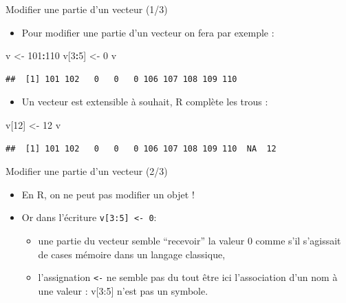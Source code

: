 \documentclass[
  ignorenonframetext,
]{beamer}
\newenvironment{Shaded}{\begin{snugshade}}{\end{snugshade}}
\newcommand{\DecValTok}[1]{\textcolor[rgb]{0.00,0.00,0.81}{#1}}
\newcommand{\NormalTok}[1]{#1}
\newcommand{\OtherTok}[1]{\textcolor[rgb]{0.56,0.35,0.01}{#1}}
\newcommand{\SpecialCharTok}[1]{\textcolor[rgb]{0.81,0.36,0.00}{\textbf{#1}}}
\providecommand{\tightlist}{%
  \setlength{\itemsep}{0pt}\setlength{\parskip}{0pt}}
\begin{document}
\begin{frame}[fragile]{Modifier une partie d'un vecteur (1/3)}
\protect\hypertarget{modifier-une-partie-dun-vecteur-13}{}
\begin{itemize}
\tightlist
\item
  Pour modifier une partie d'un vecteur on fera par exemple :
\end{itemize}

\tiny

\begin{Shaded}
\begin{Highlighting}[]
\NormalTok{v }\OtherTok{\textless{}{-}} \DecValTok{101}\SpecialCharTok{:}\DecValTok{110}
\NormalTok{v[}\DecValTok{3}\SpecialCharTok{:}\DecValTok{5}\NormalTok{] }\OtherTok{\textless{}{-}} \DecValTok{0}
\NormalTok{v}
\end{Highlighting}
\end{Shaded}

\begin{verbatim}
##  [1] 101 102   0   0   0 106 107 108 109 110
\end{verbatim}

\normalsize

\begin{itemize}
\tightlist
\item
  Un vecteur est extensible à souhait, R complète les trous :
\end{itemize}

\tiny

\begin{Shaded}
\begin{Highlighting}[]
\NormalTok{v[}\DecValTok{12}\NormalTok{] }\OtherTok{\textless{}{-}} \DecValTok{12}
\NormalTok{v}
\end{Highlighting}
\end{Shaded}

\begin{verbatim}
##  [1] 101 102   0   0   0 106 107 108 109 110  NA  12
\end{verbatim}

\normalsize
\end{frame}

\begin{frame}[fragile]{Modifier une partie d'un vecteur (2/3)}
\protect\hypertarget{modifier-une-partie-dun-vecteur-23}{}
\begin{itemize}
\tightlist
\item
  En R, on ne peut pas modifier un objet !
\item
  Or dans l'écriture \texttt{v{[}3:5{]}\ \textless{}-\ 0}:

  \begin{itemize}
  \tightlist
  \item
    une partie du vecteur semble ``recevoir'' la valeur 0 comme s'il
    s'agissait de cases mémoire dans un langage classique,
  \item
    l'assignation \texttt{\textless{}-} ne semble pas du tout être ici
    l'association d'un nom à une valeur : v{[}3:5{]} n'est pas un
    symbole.
  \end{itemize}
\end{itemize}
\end{frame}
\end{document}
